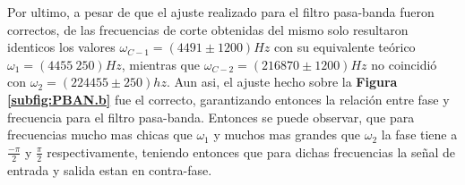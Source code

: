 \documentclass[11pt,a4paper]{article}
\begin{document}
Por ultimo, a pesar de que el ajuste realizado para el filtro pasa-banda fueron correctos, de las frecuencias de corte obtenidas del mismo solo resultaron identicos los valores $\omega_{C-1} = (4491 \pm 1200)Hz$ con su equivalente teórico $\omega_1 = (4455 \ 250)Hz$, mientras que $\omega_{C-2} = (216870 \pm 1200)Hz$ no coincidió con $\omega_2 = (224455 \pm 250)hz$. Aun asi, el ajuste hecho sobre la \textbf{Figura \ref{subfig:PBAN.b}} fue el correcto, garantizando entonces la relación entre fase y frecuencia para el filtro pasa-banda. Entonces se puede observar, que para frecuencias mucho mas chicas que $\omega_1$ y muchos mas grandes que $\omega_2$ la fase tiene a $\frac{-\pi}{2}$ y $\frac{\pi}{2}$ respectivamente, teniendo entonces que para dichas frecuencias la señal de entrada y salida estan en contra-fase.

\label{sec:conclusiones}








 
\end{document}

